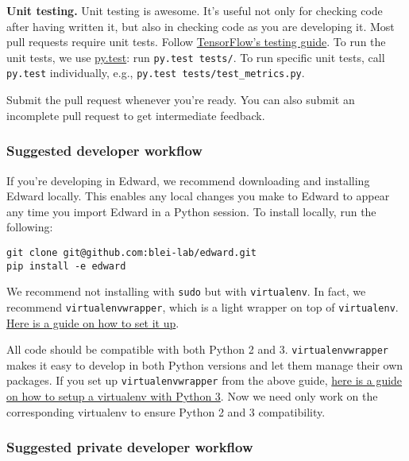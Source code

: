 \textbf{Unit testing.}
Unit testing is awesome. It's useful not only
for checking code after having written it, but also in checking code
as you are developing it.
Most pull requests require unit tests.
Follow
\href{https://www.tensorflow.org/versions/master/api_docs/python/test.html}
{TensorFlow's testing guide}.
To run the unit tests, we use
\href{http://doc.pytest.org/}{py.test}:
run \texttt{py.test tests/}.
To run specific unit tests, call \texttt{py.test} individually, e.g., \texttt{py.test tests/test_metrics.py}.

Submit the pull request whenever you're ready. You can also submit an
incomplete pull request to get intermediate feedback.

\subsubsection{Suggested developer workflow}\label{suggested-workflow}

If you're developing in Edward,
we recommend downloading and installing Edward locally. This enables
any local changes you make to Edward to appear any time you
import Edward in a Python session. To install locally, run the
following:

\begin{verbatim}
git clone git@github.com:blei-lab/edward.git
pip install -e edward
\end{verbatim}

We recommend not installing with \texttt{sudo} but with
\texttt{virtualenv}. In fact, we recommend
\texttt{virtualenvwrapper}, which is a light wrapper on top of
\texttt{virtualenv}.
\href{http://docs.python-guide.org/en/latest/starting/install/osx/}
{Here is a guide on how to set it up}.

All code should be compatible with both Python 2 and 3.
\texttt{virtualenvwrapper} makes it easy to develop in both Python versions
and let them manage their own packages.
If you set up \texttt{virtualenvwrapper} from the above guide,
\href{http://www.marinamele.com/2014/07/install-python3-on-mac-os-x-and-use-virtualenv-and-virtualenvwrapper.html}
{here is a guide on how to setup a virtualenv with Python 3}.
Now we need only work on the corresponding virtualenv to ensure Python
2 and 3 compatibility.

\subsubsection{Suggested private developer workflow}
\label{suggested-private-workflow}

